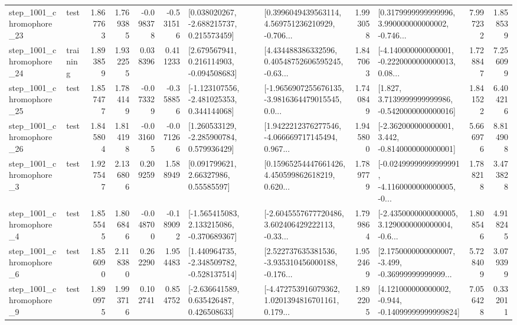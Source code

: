 \begin{tabular}{llrrrrllrlrr}
 step\_1001\_chromophore\_23 &      test &      1.867763 &    1.769385 &     -0.098378 & -0.531516 &    [0.038020267, -2.688215737, 0.215573459] &  [0.3996049439563114, 4.569751236210929, -0.706... &       1.993058 &  [0.3179999999999996, 3.990000000000002, -0.746... &            7.997232 &          1.858539 \\
 step\_1001\_chromophore\_24 &  training &      1.893859 &    1.932255 &      0.038396 &  0.411233 &    [2.679567941, 0.216114903, -0.094508683] &  [4.434488386332596, 0.40548752606595245, -0.63... &       1.847063 &  [-4.140000000000001, -0.2220000000000013, 0.08... &            1.728847 &          7.256099 \\
 step\_1001\_chromophore\_25 &      test &      1.857477 &    1.784149 &     -0.073329 & -0.358856 &   [-1.123107556, -2.481025353, 0.344144068] &  [-1.9656907255676135, -3.9816364479015545, 0.0... &       1.740849 &   [1.827, 3.7139999999999986, -0.5420000000000016] &            1.841522 &          6.404216 \\
 step\_1001\_chromophore\_26 &      test &      1.845804 &    1.814198 &     -0.031605 & -0.071266 &    [1.260533129, -2.285900784, 0.579936429] &  [1.9422212376277546, -4.066669717145494, 0.967... &       1.945800 &   [-2.362000000000001, 3.442, -0.8140000000000001] &            5.666976 &          8.814908 \\
  step\_1001\_chromophore\_3 &      test &      1.927547 &    2.136806 &      0.209259 &  1.588949 &       [0.091799621, 2.66327986, 0.55585597] &  [0.15965254447661426, 4.450599862618219, 0.620... &       1.789779 &  [-0.02499999999999991, -4.1160000000000005, -0... &            1.788218 &          3.473828 \\
  step\_1001\_chromophore\_4 &      test &      1.855545 &    1.806846 &     -0.048700 & -0.189092 &   [-1.565415083, 2.133215086, -0.370689367] &  [-2.6045557677720486, 3.602406429222113, -0.33... &       1.799864 &  [-2.4350000000000005, 3.1290000000000004, -0.6... &            1.808546 &          4.918245 \\
  step\_1001\_chromophore\_6 &      test &      1.856090 &    2.118380 &      0.262290 &  1.954483 &   [1.440964735, -2.348509782, -0.528137514] &  [2.522737635381536, -3.935310456000188, -0.176... &       1.952469 &  [2.1750000000000007, -3.499, -0.36999999999999... &            5.728409 &          3.079399 \\
  step\_1001\_chromophore\_9 &      test &      1.890975 &    1.993716 &      0.102741 &  0.854752 &    [-2.636641589, 0.635426487, 0.426508633] &  [-4.472753916079362, 1.0201394816701161, 0.179... &       1.892205 &  [4.121000000000002, -0.944, -0.14099999999999824] &            7.056428 &          0.332011 \\

\end{tabular}
